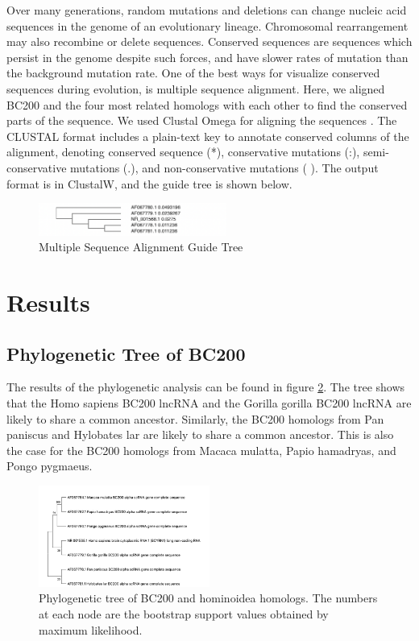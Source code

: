 \documentclass[conference, 11pt]{IEEEtran}
\begin{document}
Over many generations, random mutations and deletions can change nucleic acid sequences in the genome of an evolutionary lineage. 
Chromosomal rearrangement may also recombine or delete sequences. 
Conserved sequences are sequences which persist in the genome despite such forces, and have slower rates of mutation than the background mutation rate\cite{kimura1974some}.
One of the best ways for visualize conserved sequences during evolution, is multiple sequence alignment. 
Here, we aligned BC200 and the four most related homologs with each other to find the conserved parts of the sequence. 
We used Clustal Omega for aligning the sequences \cite{madeira2019embl}. 
The CLUSTAL format includes a plain-text key to annotate conserved columns of the alignment, denoting conserved sequence (*), conservative mutations (:), semi-conservative mutations (.), and non-conservative mutations ( ). 
The output format is in ClustalW, and the guide tree is shown below.

\begin{figure}[ht]
  \centering
  \label{fig:Guide-tree}
  \includegraphics[width=0.55\textwidth]{figs/guidetree.png}
  \caption{Multiple Sequence Alignment Guide Tree}
\end{figure}

\section{Results}\label{sec:results}

\subsection{Phylogenetic Tree of BC200}

The results of the phylogenetic analysis can be found in figure \ref{fig:phylo-tree}. 
The tree shows that the Homo sapiens BC200 lncRNA and the Gorilla gorilla BC200 lncRNA are likely to share a common ancestor. 
Similarly, the BC200 homologs from Pan paniscus and Hylobates lar are likely to share a common ancestor. 
This is also the case for the BC200 homologs from Macaca mulatta, Papio hamadryas, and Pongo pygmaeus. 

\begin{figure}[ht]
  \centering
  \includegraphics[width=0.5\textwidth]{figs/phylogenetic-tree.jpg}
  \caption{Phylogenetic tree of BC200 and hominoidea homologs. The numbers at each node are the bootstrap support values obtained by maximum likelihood.}
  \label{fig:phylo-tree}
\end{figure}
\end{document}
